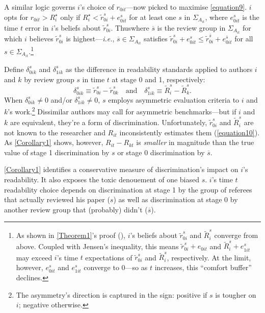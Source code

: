 A similar logic governs $i$'s choice of $r_{0it}$---now picked to maximise \autoref{equation9}. $i$ opts for $r_{0it}>R_i^\star$ only if $R_i^\star<\widetilde r_{0i}^s+e_{0it}^s$ for at least one $s$ in $\Sigma_{A_{it}}$, where $e_{0it}^s$ is the time $t$ error in $i$'s beliefs about $\widetilde r_{0i}^s$. Thuswhere $\overline s$ is the review group in $\Sigma_{A_{it}}$ for which $i$ believes $\widetilde r_{0i}^s$ is highest---\emph{i.e.}, $\overline s\in\Sigma_{A_{it}}$ satisfies $\widetilde r_{0i}^s+e_{0it}^s\le\widetilde r_{0i}^{\overline s}+e_{0it}^{\overline s}$ for all $s\in\Sigma_{A_{it}}$.\footnote{\label{Footnote68}As shown in \autoref{Theorem1}'s proof (), $i$'s beliefs about $\widetilde r_{0i}^s$ and $\widetilde R_i^s$ converge from above. Coupled with Jensen's inequality, this means $\widetilde r_{0i}^s+e_{0it}$ and $\widetilde R_i^s+e_{1it}^s$ may exceed $i$'s time $t$ expectations of $\widetilde r_{0i}^s$ and $\widetilde R_i^s$, respectively. At the limit, however, $e_{0it}^s$ and $e_{1it}^s$ converge to 0---so as $t$ increases, this ``comfort buffer'' declines.}

Define $\delta_{0ik}^s$ and $\delta_{1ik}^s$ as the difference in readability standards applied to authors $i$ and $k$ by review group $s$ in time $t$ at stage 0 and 1, respectively: $$\delta_{0ik}^s\equiv\widetilde r_{0i}^s-\widetilde r_{0k}^s\quad\text{and}\quad\delta_{1ik}^s\equiv\widetilde R_i^s-\widetilde R_k^s.$$ When $\delta_{0ik}^s\ne0$ and\slash or $\delta_{1ik}^s\ne0$, $s$ employs asymmetric evaluation criteria to $i$ and $k$'s work.\footnote{The asymmetry's direction is captured in the sign: positive if $s$ is tougher on $i$; negative otherwise.} Dissimilar authors may call for asymmetric benchmarks---but if $i$ and $k$ are equivalent, they're a form of discrimination. Unfortunately, $\widetilde r_{0i}^s$ and $\widetilde R_i^s$ are not known to the researcher and $R_{it}$ inconsistently estimates them (\autoref{equation10}). As \autoref{Corollary1} shows, however, $R_{it}-R_{kt}$ is \emph{smaller} in magnitude than the true value of stage 1 discrimination by $s$ or stage 0 discrimination by $\overline s$.



\autoref{Corollary1} identifies a conservative measure of discrimination's impact on $i$'s readability. It also exposes the toxic denouement of one biased $s$. $i$'s time $t$ readability choice depends on discrimination at stage 1 by the group of referees that actually reviewed his paper ($s$) as well as discrimination at stage 0 by another review group that (probably) didn't ($\overline s$).

